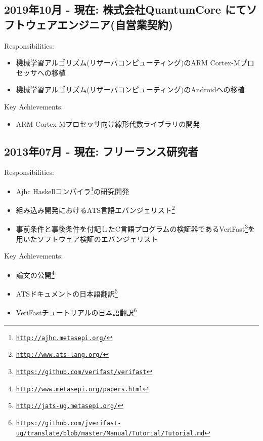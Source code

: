 \documentclass[letterpaper]{article}
\begin{document}
\subsection*{2019年10月 - 現在: 株式会社QuantumCore にてソフトウェアエンジニア(自営業契約)}

\noindent Responsibilities:

\begin{itemize}
  \item 機械学習アルゴリズム(リザーバコンピューティング)のARM Cortex-Mプロセッサへの移植
  \item 機械学習アルゴリズム(リザーバコンピューティング)のAndroidへの移植
\end{itemize}

\noindent Key Achievements:

\begin{itemize}
  \item ARM Cortex-Mプロセッサ向け線形代数ライブラリの開発
\end{itemize}

\subsection*{2013年07月 - 現在: フリーランス研究者}

\noindent Responsibilities:

\begin{itemize}
  \item Ajhc Haskellコンパイラ\footnote{\href{http://ajhc.metasepi.org/}{\tt http://ajhc.metasepi.org/}}の研究開発
  \item 組み込み開発におけるATS言語エバンジェリスト\footnote{\href{http://www.ats-lang.org/}{\tt http://www.ats-lang.org/}}
  \item 事前条件と事後条件を付記したC言語プログラムの検証器であるVeriFast\footnote{\href{https://github.com/verifast/verifast}{\tt https://github.com/verifast/verifast}}を用いたソフトウェア検証のエバンジェリスト
\end{itemize}

\noindent Key Achievements:

\begin{itemize}
  \item 論文の公開\footnote{\href{http://www.metasepi.org/papers.html}{\tt http://www.metasepi.org/papers.html}}
  \item ATSドキュメントの日本語翻訳\footnote{\href{http://jats-ug.metasepi.org/}{\tt http://jats-ug.metasepi.org/}}
  \item VeriFastチュートリアルの日本語翻訳\footnote{\href{https://github.com/jverifast-ug/translate/blob/master/Manual/Tutorial/Tutorial.md}{\tt https://github.com/jverifast-ug/translate/blob/master/Manual/Tutorial/Tutorial.md}}
\end{itemize}
\end{document}
